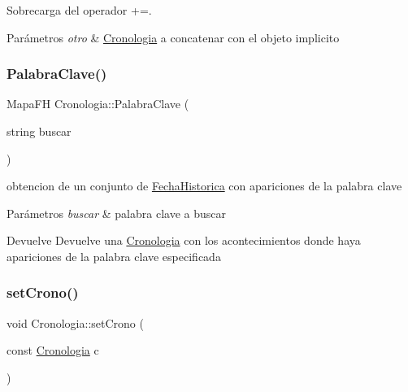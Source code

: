 Sobrecarga del operador +=. 


\begin{DoxyParams}{Parámetros}
{\em otro} & \hyperlink{classCronologia}{Cronologia} a concatenar con el objeto implicito \\
\hline
\end{DoxyParams}
\mbox{\label{classCronologia_a43b561e8e1e896372f797247058a4a0d}} 
\subsubsection{\texorpdfstring{Palabra\+Clave()}{PalabraClave()}}
{\footnotesize\ttfamily Mapa\+FH Cronologia\+::\+Palabra\+Clave (\begin{DoxyParamCaption}\item[{string}]{buscar }\end{DoxyParamCaption})}



obtencion de un conjunto de \hyperlink{classFechaHistorica}{Fecha\+Historica} con apariciones de la palabra clave 


\begin{DoxyParams}{Parámetros}
{\em buscar} & palabra clave a buscar \\
\hline
\end{DoxyParams}
\begin{DoxyReturn}{Devuelve}
Devuelve una \hyperlink{classCronologia}{Cronologia} con los acontecimientos donde haya apariciones de la palabra clave especificada 
\end{DoxyReturn}
\mbox{\label{classCronologia_ab543199019ac2916b86d510d429f5e4a}} 
\subsubsection{\texorpdfstring{set\+Crono()}{setCrono()}}
{\footnotesize\ttfamily void Cronologia\+::set\+Crono (\begin{DoxyParamCaption}\item[{const \hyperlink{classCronologia}{Cronologia}}]{c }\end{DoxyParamCaption})}



